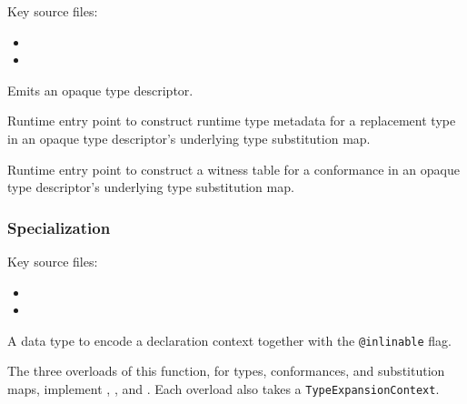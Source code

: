 \documentclass[../generics]{subfiles}
\begin{document}
Key source files:
\begin{itemize}
\item {}
\item {}
\end{itemize}

Emits an opaque type descriptor.

Runtime entry point to construct runtime type metadata for a replacement type in an opaque type descriptor's underlying type substitution map.

Runtime entry point to construct a witness table for a conformance in an opaque type descriptor's underlying type substitution map.

\subsubsection*{Specialization}

Key source files:
\begin{itemize}
\item {}
\item {}
\end{itemize}

A data type to encode a declaration context together with the \verb|@inlinable| flag.

The three overloads of this function, for types, conformances, and substitution maps, implement , , and . Each overload also takes a \texttt{TypeExpansionContext}.
\end{document}

